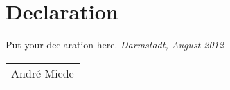 \documentclass[ twoside,openright,titlepage,numbers=noenddot,headinclude,
                footinclude=true,cleardoublepage=empty,abstractoff,%
                BCOR=5mm,paper=letter,fontsize=11pt,letterpaper,%
                american,%
                ]{scrreprt}
\newcommand{\myName}{Andr\'e Miede\xspace}
\newcommand{\myLocation}{Darmstadt\xspace}
\newcommand{\myTime}{August 2012\xspace}
\newcounter{dummy}
\begin{document}
\chapter*{Declaration}
\thispagestyle{empty}
Put your declaration here.
\bigskip
\noindent\textit{\myLocation, \myTime}
\smallskip
\begin{flushright}
    \begin{tabular}{m{5cm}}
        \\ \hline
        \centering\myName \\
    \end{tabular}
\end{flushright}
\end{document}
